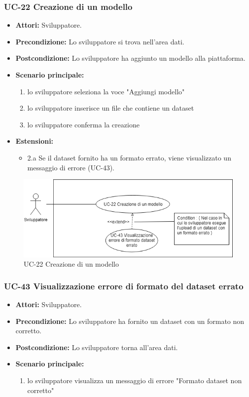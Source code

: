 	\subsubsection{UC-22 Creazione di un modello}		
		\begin{itemize}
			\item \textbf{Attori:} Sviluppatore.
			\item \textbf{Precondizione:} Lo sviluppatore si trova nell'area dati.
			\item \textbf{Postcondizione:} Lo sviluppatore ha aggiunto un modello alla piattaforma.
			\item \textbf{Scenario principale:}
			\begin{enumerate}
				\item lo sviluppatore seleziona la voce "Aggiungi modello"
				\item lo sviluppatore inserisce un file che contiene un dataset
				\item lo sviluppatore conferma la creazione
			\end{enumerate}
			\item \textbf{Estensioni:}
				\begin{itemize}
					\item 2.a Se il dataset fornito ha un formato errato, viene visualizzato un messaggio di errore (UC-43).
				\end{itemize}
		\end{itemize}
		
		\begin{figure}[h]
			\centering
			\includegraphics[scale=0.7]{images/UC-22.png}
				\caption{UC-22 Creazione di un modello}
		\end{figure}	
	
	\subsubsection{UC-43 Visualizzazione errore di formato del dataset errato}	
	\begin{itemize}					
			\item \textbf{Attori:} Sviluppatore.
			\item \textbf{Precondizione:} Lo sviluppatore ha fornito un dataset con un formato non corretto.
			\item \textbf{Postcondizione:} Lo sviluppatore torna all'area dati.
			\item \textbf{Scenario principale:}
				\begin{enumerate}
					\item lo sviluppatore visualizza un messaggio di errore "Formato dataset non corretto"
				\end{enumerate}	
		\end{itemize}		
	
